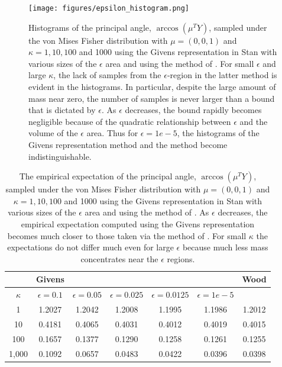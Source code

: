 \documentclass[ba]{imsart}
\numberwithin{equation}{section}
\theoremstyle{plain}
\begin{document}
\begin{figure}[h]
\centering
\vspace{.1in}
\texttt{[image: figures/epsilon\_histogram.png]}
\vspace{.05in}
\caption{Histograms of the principal angle, $\arccos (\mu^T Y)$, sampled under the von Mises Fisher distribution with $\mu = (0,0,1)$ and $\kappa = 1, 10, 100$ and 1000 using the Givens representation in Stan with various sizes of the $\epsilon$ area and using the method of \citet{wood1994simulation}. For small $\epsilon$ and large $\kappa$, the lack of samples from the $\epsilon$-region in the latter method is evident in the histograms. In particular, despite the large amount of mass near zero, the number of samples is never larger than a bound that is dictated by $\epsilon$. As $\epsilon$ decreases, the bound rapidly becomes negligible because of the quadratic relationship between $\epsilon$ and the volume of the $\epsilon$ area. Thus for $\epsilon = 1e-5$, the histograms of the Givens representation method and the \citet{wood1994simulation} method become indistinguishable.}
\label{fig:epsilon_histogram}
\end{figure}

\begin{table}
\begin{tabular}{|c||ccccc|c|}
\hline
 &   Givens &  &  &  & & Wood\\
\hline
$\kappa$ & $\epsilon = 0.1$ & $\epsilon = 0.05$ & $\epsilon = 0.025$ & $\epsilon = 0.0125$ & $\epsilon = 1e-5$ & \\
\hline
\hline
1 & 1.2027 & 1.2042 & 1.2008 & 1.1995 & 1.1986 & 1.2012\\
10 & 0.4181 & 0.4065 & 0.4031 & 0.4012 & 0.4019 & 0.4015\\
100 & 0.1657 & 0.1377 & 0.1290 & 0.1258 & 0.1261 & 0.1255 \\
1,000 & 0.1092 & 0.0657 & 0.0483 & 0.0422 & 0.0396 & 0.0398\\
\hline
\end{tabular}
\caption{The empirical expectation of the principal angle, $\arccos (\mu^T Y)$, sampled under the von Mises Fisher distribution with $\mu = (0,0,1)$ and $\kappa = 1, 10, 100$ and 1000 using the Givens representation in Stan with various sizes of the $\epsilon$ area and using the method of \citet{wood1994simulation}. As $\epsilon$ decreases, the empirical expectation computed using the Givens representation becomes much closer to those taken via the method of \citet{wood1994simulation}. For small $\kappa$ the expectations do not differ much even for large $\epsilon$ because much less mass concentrates near the $\epsilon$ regions.}
\label{tab:vmf_epsilon_region_expectations}
\end{table}
\end{document}
